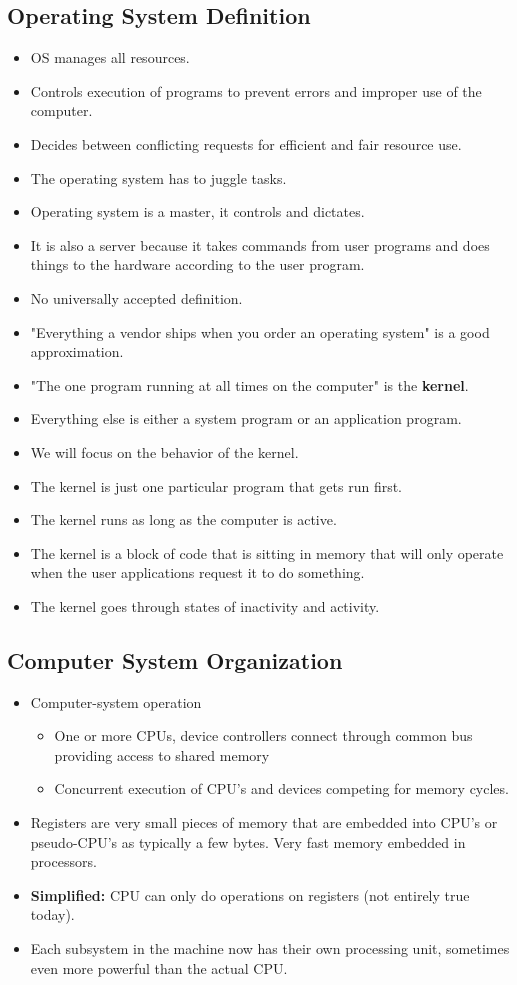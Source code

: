 \documentclass[]{article}
\begin{document}
\subsection{Operating System Definition}
\begin{itemize}
\item OS manages all resources.
\item Controls execution of programs to prevent errors and improper use of the
computer.
\item Decides between conflicting requests for efficient and fair resource use.
\item The operating system has to juggle tasks.
\item Operating system is a master, it controls and dictates.
\item It is also a server because it takes commands from user programs and does
things to the hardware according to the user program.
\item No universally accepted definition.
\item "Everything a vendor ships when you order an operating system" is a good
approximation.
\item "The one program running at all times on the computer" is the
\textbf{kernel}.
\item Everything else is either a system program or an application program.
\item We will focus on the behavior of the kernel.
\item The kernel is just one particular program that gets run first.
\item The kernel runs as long as the computer is active.
\item The kernel is a block of code that is sitting in memory that will only
operate when the user applications request it to do something.
\item The kernel goes through states of inactivity and activity.
\end{itemize}

\subsection{Computer System Organization}
\begin{itemize}
\item Computer-system operation
\begin{itemize}
\item One or more CPUs, device controllers connect through common bus providing
access to shared memory
\item Concurrent execution of CPU's and devices competing for memory cycles.
\end{itemize}
\item Registers are very small pieces of memory that are embedded into CPU's or
pseudo-CPU's as typically a few bytes. Very fast memory embedded in processors.
\item \textbf{Simplified:} CPU can only do operations on registers (not entirely
true today).
\item Each subsystem in the machine now has their own processing unit, sometimes
even more powerful than the actual CPU.
\end{itemize}
\end{document}
